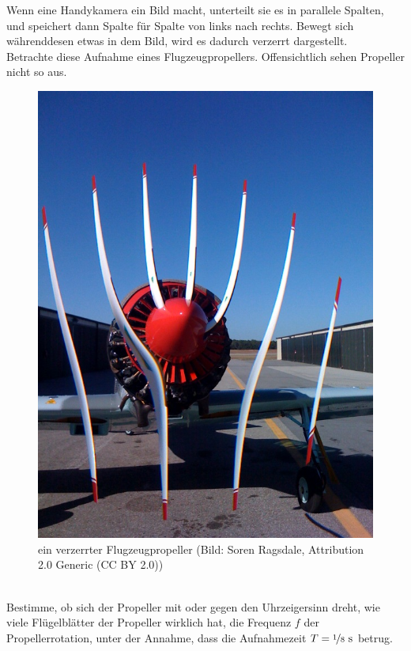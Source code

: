 \begin{Exercise}[label = rollingshutter, title = Flugzeugpropeller, origin = Aaron  Wild, difficulty = 0]
		Wenn eine Handykamera ein Bild macht, unterteilt sie es in parallele Spalten, und speichert dann Spalte für Spalte von links nach rechts. Bewegt sich währenddesen etwas in dem Bild, wird es dadurch verzerrt dargestellt.\\
		Betrachte diese  Aufnahme eines Flugzeugpropellers. Offensichtlich sehen Propeller nicht so aus.
	\begin{figure}[h]
		\centering
		\includegraphics[scale = .25]{../tasks/kalda/rollingshutter.jpg}
		\caption{ein verzerrter Flugzeugpropeller (Bild: Soren Ragsdale, Attribution 2.0 Generic (CC BY 2.0))}
	\end{figure}\\
 Bestimme,
		\Question ob sich der Propeller mit oder gegen den Uhrzeigersinn dreht,
		\Question wie viele Flügelblätter der Propeller wirklich hat,
		\Question die Frequenz $f$ der Propellerrotation, unter der Annahme, dass die Aufnahmezeit $T=\nicefrac{1}{8}~\mathrm{s}$ betrug.
	
\end{Exercise}
